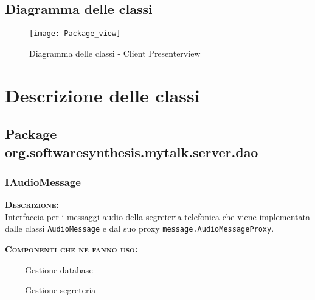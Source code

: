 \subsection{Diagramma delle classi}
\begin{figure}[H]
\begin{center}
\texttt{[image: Package\_view]}
\caption{Diagramma delle classi - Client Presenterview}\label{fig:package_client_presenterview}
\end{center}
\end{figure}
\clearpage

\section{Descrizione delle classi}

\subsection{Package org.softwaresynthesis.mytalk.server.dao}

\subsubsection{IAudioMessage}
\begin{description}
	\item{\scshape\bfseries Descrizione:}\\
Interfaccia per i messaggi audio della segreteria telefonica che viene implementata dalle classi \texttt{AudioMessage} e dal suo proxy \texttt{message.AudioMessageProxy}.
	\item{\scshape\bfseries Componenti che ne fanno uso:}
	  \begin{itemize}[noitemsep,nolistsep]
	  \item[-] Gestione database
	  \item[-] Gestione segreteria
	  \end{itemize}
\end{description}

